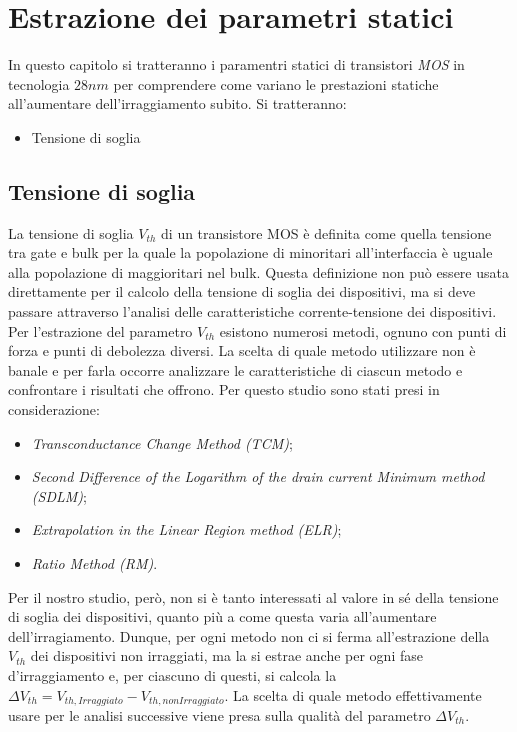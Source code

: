 \documentclass[
	a4paper,
	cleardoublepage=empty,
	headings=twolinechapter,
	numbers=autoenddot,
]{scrbook}
\begin{document}
\chapter{Estrazione dei parametri statici}
In questo capitolo si tratteranno i paramentri statici di transistori \emph{MOS} in tecnologia $28 nm$ per comprendere come variano le prestazioni statiche all'aumentare dell'irraggiamento subito. Si tratteranno:
\begin{itemize}
  \item Tensione di soglia
\end{itemize}
\section{Tensione di soglia}

La tensione di soglia $V_{th}$ di un transistore MOS è definita come quella tensione tra gate e bulk per la quale la popolazione di minoritari all'interfaccia è uguale alla popolazione di maggioritari nel bulk. Questa definizione non può essere usata direttamente per il calcolo della tensione di soglia dei dispositivi, ma si deve passare attraverso l'analisi delle caratteristiche corrente-tensione dei dispositivi. \\
Per l'estrazione del parametro $V_{th}$ esistono numerosi metodi, ognuno con punti di forza e punti di debolezza diversi. La scelta di quale metodo utilizzare non è banale e per farla occorre analizzare le caratteristiche di ciascun metodo e confrontare i risultati che offrono. Per questo studio sono stati presi in considerazione:

\begin{itemize}
  \item \emph{Transconductance Change Method (TCM)};
  \item \emph{Second Difference of the Logarithm of the drain current Minimum method (SDLM)};
  \item \emph{Extrapolation in the Linear Region method (ELR)};
  \item \emph{Ratio Method (RM)}. 
\end{itemize}

Per il nostro studio, però, non si è tanto interessati al valore in sé della tensione di soglia dei dispositivi, quanto più a come questa varia all'aumentare dell'irragiamento. Dunque, per ogni metodo non ci si ferma all'estrazione della $V_{th}$ dei dispositivi non irraggiati, ma la si estrae anche per ogni fase d'irraggiamento e, per ciascuno di questi, si calcola la $\Delta V_{th} = V_{th, Irraggiato}-V_{th, non Irraggiato}$. La scelta di quale metodo effettivamente usare per le analisi successive viene presa sulla qualità del parametro $\Delta V_{th}$.
\end{document}
